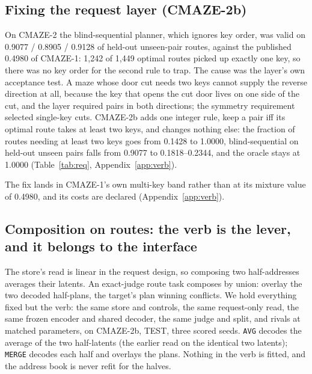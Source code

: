\documentclass{article}
\begin{document}
\subsection{Fixing the request layer (CMAZE-2b)}
\label{sec:req-layer}

On CMAZE-2 the blind-sequential planner, which ignores key order, was valid on 0.9077 /
0.8905 / 0.9128 of held-out unseen-pair routes, against the published 0.4980 of CMAZE-1: 1,242
of 1,449 optimal routes picked up exactly one key, so there was no key order for the second rule
to trap.
The cause was the layer's own acceptance test. A maze whose door cut needs two keys cannot
supply the reverse direction at all, because the key that opens the cut door lives on one side
of the cut, and the layer required pairs in both directions; the symmetry requirement selected
single-key cuts.
CMAZE-2b adds one integer rule, keep a pair iff its optimal route takes at least two keys, and
changes nothing else: the fraction of routes needing at least two keys goes from 0.1428 to
1.0000, blind-sequential on held-out unseen pairs falls from 0.9077 to 0.1818--0.2344, and the
oracle stays at 1.0000 (Table~\ref{tab:req}, Appendix~\ref{app:verb}).

The fix lands in CMAZE-1's own multi-key band rather than at its mixture value of 0.4980, and
its costs are declared (Appendix~\ref{app:verb}).

\subsection{Composition on routes: the verb is the lever, and it belongs to the interface}
\label{sec:verb}

The store's read is linear in the request design, so composing two half-addresses averages
their latents. An exact-judge route task composes by union: overlay the two decoded half-plans,
the target's plan winning conflicts. We hold everything fixed but the verb: the same store and
controls, the same request-only read, the same frozen encoder and shared decoder, the same
judge and split, and rivals at matched parameters, on CMAZE-2b, TEST, three scored seeds.
\texttt{AVG} decodes the average of the two half-latents (the earlier read on the identical two
latents); \texttt{MERGE} decodes each half and overlays the plans. Nothing in the verb is
fitted, and the address book is never refit for the halves.
\end{document}
